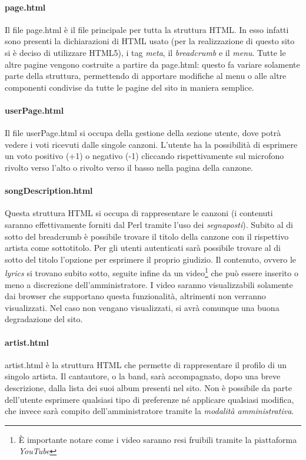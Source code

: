 \paragraph*{page.html} Il file page.html \`e il file principale per tutta la struttura HTML. In esso infatti sono presenti la dichiarazioni di HTML usato (per la realizzazione di questo sito si \`e deciso di utilizzare HTML5), i tag \textit{meta}, il \textit{breadcrumb} e il \textit{menu}. Tutte le altre pagine vengono costruite a partire da page.html: questo fa variare solamente parte della struttura, permettendo di apportare modifiche al menu o alle altre componenti condivise da tutte le pagine del sito in maniera semplice.

\paragraph*{userPage.html} Il file userPage.html si occupa della gestione della sezione utente, dove potrà vedere i voti ricevuti dalle singole canzoni. L'utente ha la possibilità di esprimere un voto positivo (+1) o negativo (-1) cliccando rispettivamente sul microfono rivolto verso l'alto o rivolto verso il basso nella pagina della canzone.

\paragraph*{songDescription.html} Questa struttura HTML si occupa di rappresentare le canzoni (i contenuti saranno effettivamente forniti dal Perl tramite l'uso dei \textit{segnaposti}). Subito al di sotto del breadcrumb è possibile trovare il titolo della canzone con il rispettivo artista come sottotitolo. Per gli utenti autenticati sarà possibile trovare al di sotto del titolo l'opzione per esprimere il proprio giudizio. Il contenuto, ovvero le \textit{lyrics} si trovano subito sotto, seguite infine da un video\footnote{È importante notare come i video saranno resi fruibili tramite la piattaforma \textit{YouTube}} che può essere inserito o meno a discrezione dell'amministratore. I video saranno visualizzabili solamente dai browser che supportano questa funzionalità, altrimenti non verranno visualizzati. Nel caso non vengano visualizzati, si avr\`a comunque una buona degradazione del sito.

\paragraph*{artist.html} artist.html è la struttura HTML che permette di rappresentare il profilo di un singolo artista. Il cantautore, o la band, sarà accompagnato, dopo una breve descrizione, dalla lista dei suoi album presenti nel sito. Non è possibile da parte dell'utente esprimere qualsiasi tipo di preferenze né applicare qualsiasi modifica, che invece sarà compito dell'amministratore tramite la \textit{modalità amministrativa}.

